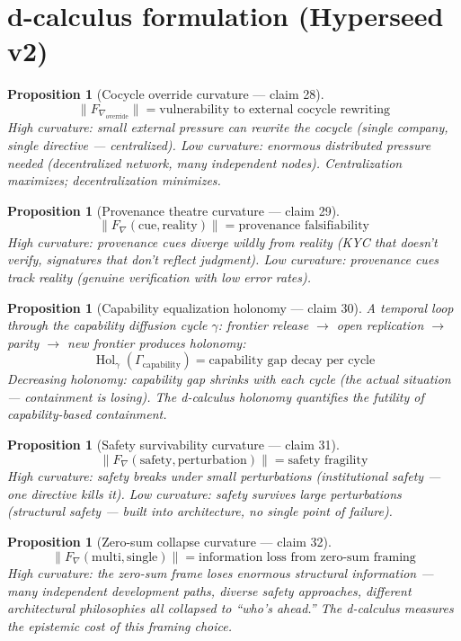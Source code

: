 \documentclass[11pt,a4paper]{article}
\newtheorem{proposition}[definition]{Proposition}
\begin{document}
\section{d-calculus formulation (Hyperseed v2)}

\begin{proposition}[Cocycle override curvature --- claim 28]
\label{prop:override_curv}
\[
  \|F_{\nabla_{\text{override}}}\| = \text{vulnerability to external
    cocycle rewriting}
\]
High curvature: small external pressure can rewrite the cocycle (single
company, single directive --- centralized). Low curvature: enormous
distributed pressure needed (decentralized network, many independent
nodes). Centralization maximizes; decentralization minimizes.
\end{proposition}

\begin{proposition}[Provenance theatre curvature --- claim 29]
\label{prop:prov_curv}
\[
  \|F_\nabla(\text{cue}, \text{reality})\| = \text{provenance
    falsifiability}
\]
High curvature: provenance cues diverge wildly from reality (KYC that
doesn't verify, signatures that don't reflect judgment). Low curvature:
provenance cues track reality (genuine verification with low error rates).
\end{proposition}

\begin{proposition}[Capability equalization holonomy --- claim 30]
\label{prop:cap_hol}
A temporal loop through the capability diffusion cycle $\gamma$:
frontier release $\to$ open replication $\to$ parity $\to$ new frontier
produces holonomy:
\[
  \operatorname{Hol}_\gamma(\Gamma_{\text{capability}}) =
    \text{capability gap decay per cycle}
\]
Decreasing holonomy: capability gap shrinks with each cycle (the actual
situation --- containment is losing). The d-calculus holonomy quantifies
the futility of capability-based containment.
\end{proposition}

\begin{proposition}[Safety survivability curvature --- claim 31]
\label{prop:surv_curv}
\[
  \|F_\nabla(\text{safety}, \text{perturbation})\| = \text{safety
    fragility}
\]
High curvature: safety breaks under small perturbations (institutional
safety --- one directive kills it). Low curvature: safety survives
large perturbations (structural safety --- built into architecture,
no single point of failure).
\end{proposition}

\begin{proposition}[Zero-sum collapse curvature --- claim 32]
\label{prop:zs_curv}
\[
  \|F_\nabla(\text{multi}, \text{single})\| = \text{information loss
    from zero-sum framing}
\]
High curvature: the zero-sum frame loses enormous structural information
--- many independent development paths, diverse safety approaches,
different architectural philosophies all collapsed to ``who's ahead.''
The d-calculus measures the epistemic cost of this framing choice.
\end{proposition}
\end{document}

